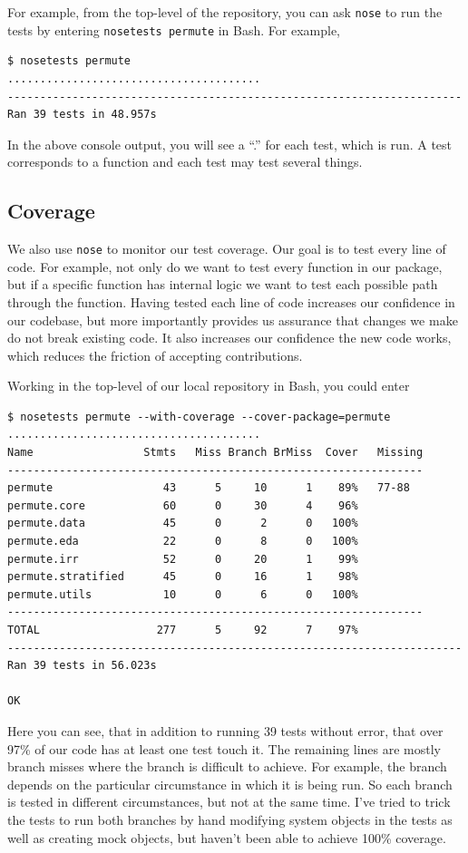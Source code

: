 For example, from the top-level of the repository, you can ask \texttt{nose}
to run the tests by entering \texttt{nosetests permute} in Bash.  For example,

\begin{verbatim}
$ nosetests permute
.......................................
----------------------------------------------------------------------
Ran 39 tests in 48.957s
\end{verbatim}

In the above console output, you will see a ``.'' for each test, which
is run.  A test corresponds to a function and each test may test several
things.

\subsection{Coverage}

We also use \texttt{nose} to monitor our test coverage.  Our goal is to
test every line of code.  For example, not only do we want to test every
function in our package, but if a specific function has internal logic
we want to test each possible path through the function.  Having tested
each line of code increases our confidence in our codebase, but more
importantly provides us assurance that changes we make do not break
existing code.  It also increases our confidence the new code works,
which reduces the friction of accepting contributions.

Working in the top-level of our local repository in Bash, you could
enter

\begin{verbatim}
$ nosetests permute --with-coverage --cover-package=permute
.......................................
Name                 Stmts   Miss Branch BrMiss  Cover   Missing
----------------------------------------------------------------
permute                 43      5     10      1    89%   77-88
permute.core            60      0     30      4    96%   
permute.data            45      0      2      0   100%   
permute.eda             22      0      8      0   100%   
permute.irr             52      0     20      1    99%   
permute.stratified      45      0     16      1    98%   
permute.utils           10      0      6      0   100%   
----------------------------------------------------------------
TOTAL                  277      5     92      7    97%   
----------------------------------------------------------------------
Ran 39 tests in 56.023s

OK
\end{verbatim}
Here you can see, that in addition to running 39 tests without error,
that over 97\% of our code has at least one test touch it.  The remaining
lines are mostly branch misses where the branch is difficult to achieve.
For example, the branch depends on the particular circumstance in which
it is being run. So each branch is tested in different circumstances, but
not at the same time. I've tried to trick the tests to run both branches by
hand modifying system objects in the tests as well as creating mock objects,
but haven't been able to achieve 100\% coverage.

